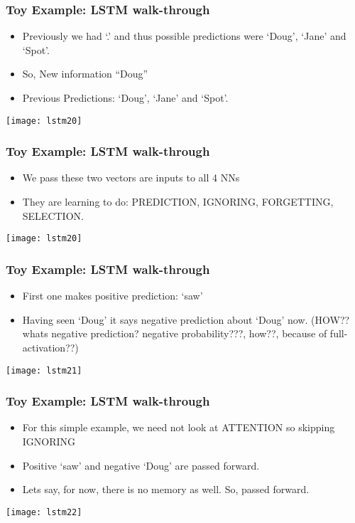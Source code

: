 \begin{frame}[fragile] \frametitle{Toy Example: LSTM walk-through}
\begin{itemize}
\item  Previously we had `.' and thus possible predictions were `Doug', `Jane' and `Spot'.
\item So, New information ``Doug''
\item Previous Predictions: `Doug', `Jane' and `Spot'.
\end{itemize}
\begin{center}
\texttt{[image: lstm20]}
\end{center}
\end{frame}

\begin{frame}[fragile] \frametitle{Toy Example: LSTM walk-through}
\begin{itemize}
\item We pass these two vectors are inputs to all 4 NNs
\item They are learning to do: PREDICTION, IGNORING, FORGETTING, SELECTION.
\end{itemize}
\begin{center}
\texttt{[image: lstm20]}
\end{center}
\end{frame}

\begin{frame}[fragile] \frametitle{Toy Example: LSTM walk-through}
\begin{itemize}
\item First one makes positive prediction: `saw'
\item Having seen `Doug' it says negative prediction about `Doug' now. (HOW?? whats negative prediction? negative probability???, how??, because of full-activation??)
\end{itemize}
\begin{center}
\texttt{[image: lstm21]}
\end{center}
\end{frame}

\begin{frame}[fragile] \frametitle{Toy Example: LSTM walk-through}
\begin{itemize}
\item For this simple example, we need not look at ATTENTION so skipping IGNORING
\item Positive `saw' and negative `Doug' are passed forward.
\item Lets say, for now, there is no memory as well. So, passed forward.
\end{itemize}
\begin{center}
\texttt{[image: lstm22]}
\end{center}
\end{frame}

